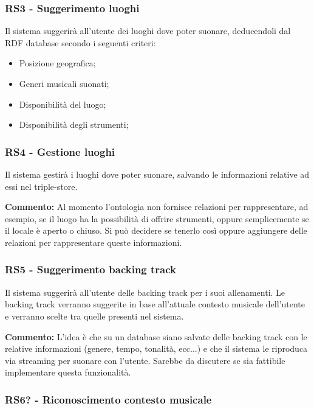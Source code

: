 \documentclass[12pt, a4paper]{article}
\begin{document}
\subsubsection*{\hypertarget{RS3}{RS3 - Suggerimento luoghi}}

Il sistema suggerirà all'utente dei luoghi dove poter suonare, deducendoli dal RDF database secondo i seguenti criteri:
\begin{itemize}
    \item Posizione geografica;
    \item Generi musicali suonati;
    \item Disponibilità del luogo;
    \item Disponibilità degli strumenti;
\end{itemize}

\subsubsection*{\hypertarget{RS4}{RS4 - Gestione luoghi}}

Il sistema gestirà i luoghi dove poter suonare, salvando le informazioni relative ad essi nel triple-store.

\textbf{Commento: }Al momento l'ontologia non fornisce relazioni per rappresentare, ad esempio, se il luogo ha la possibilità di offrire strumenti, oppure semplicemente se il locale è aperto o chiuso. Si può decidere se tenerlo così oppure aggiungere delle relazioni per rappresentare queste informazioni.


\subsubsection*{\hypertarget{RS5}{RS5 - Suggerimento backing track}}

Il sistema suggerirà all'utente delle backing track per i suoi allenamenti. Le backing track verranno suggerite in base all'attuale contesto musicale dell'utente e verranno scelte tra quelle presenti nel sistema.

\textbf{Commento: }L'idea è che su un database siano salvate delle backing track con le relative informazioni (genere, tempo, tonalità, ecc...) e che il sistema le riproduca via streaming per suonare con l'utente. Sarebbe da discutere se sia fattibile implementare questa funzionalità.

\subsubsection*{\hypertarget{RS6}{RS6? - Riconoscimento contesto musicale}}
\end{document}
